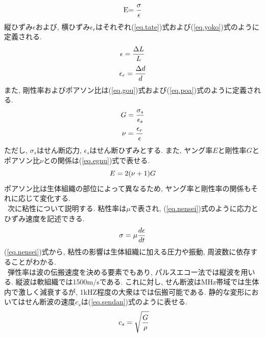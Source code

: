 \begin{equation}
\label{eq.young}
\\$E$ =  \dfrac{\sigma}{\epsilon}
\end{equation}
縦ひずみ$\epsilon$および, 横ひずみ$\epsilon_r$はそれぞれ(\ref{eq.tate})式および(\ref{eq.yoko})式のように定義される. 
\begin{equation}
\label{eq.tate}
\\\epsilon =  \dfrac{\Delta L}{L}
\end{equation}
\begin{equation}
\label{eq.yoko}
\\\epsilon_r =  \dfrac{\Delta d}{d}
\end{equation}
また, 剛性率およびポアソン比は(\ref{eq.gou})式および(\ref{eq.poa})式のように定義される. 
\begin{equation}
\label{eq.gou}
\\G =  \dfrac{\sigma_s}{\epsilon_s}
\end{equation}
\begin{equation}
\label{eq.poa}
\\\nu =  \dfrac{\epsilon_r}{\epsilon}
\end{equation}
ただし, $\sigma_s$はせん断応力, $\epsilon_s$はせん断ひずみとする. また, ヤング率$E$と剛性率$G$とポアソン比$\nu$との関係は(\ref{eq.egnu})式で表せる. 
\begin{equation}
\label{eq.egnu}
\\E=  2(\nu + 1)G
\end{equation}
ポアソン比は生体組織の部位によって異なるため, ヤング率と剛性率の関係もそれに応じて変化する. 
\\\ 次に粘性について説明する. 粘性率は$\mu$で表され, (\ref{eq.nensei})式のように応力とひずみ速度を記述できる. 
\begin{equation}
\label{eq.nensei}
\\\sigma =  \mu \dfrac{d \epsilon}{dt}
\end{equation}
(\ref{eq.nensei})式から, 粘性の影響は生体組織に加える圧力や振動, 周波数に依存することがわかる.
\\\ 弾性率は波の伝搬速度を決める要素でもあり, パルスエコー法では縦波を用いる. 縦波は軟組織では1500m/sである. これに対し, せん断波はMHz帯域では生体内で激しく減衰するが, 1kHZ程度の大衆はでは伝搬可能である. 静的な変形においてはせん断波の速度$c_s$は(\ref{eq.sendan})式のように表せる.
\begin{equation}
\label{eq.sendan}
\\\ c_s = \sqrt{\dfrac{G}{\rho}}
\end{equation}
